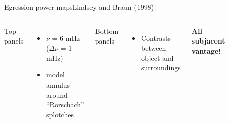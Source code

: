 \documentclass{beamer}
\begin{document}
\begin{frame}{Egression power maps}{Lindsey and Braun (1998)}
    \begin{columns}
        Top panels
        \begin{itemize}
            \item $\nu$ = 6 mHz ($\Delta\nu$ = 1 mHz)
            \item model annulus around ``Rorschach'' splotches
        \end{itemize}
        Bottom panels
        \begin{itemize}
            \item Contrasts between object and surroundings
        \end{itemize}
        \textcolor{cpink}{\textbf{All subjacent vantage!}}
        \begin{figure}
            \vspace{-1cm}
            \includegraphics[width=0.95\textwidth]{fig_5.png}
        \end{figure}
    \end{columns}
\end{frame}
\end{document}
